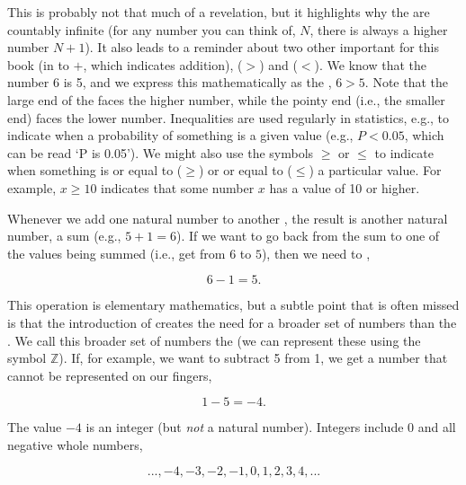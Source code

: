\documentclass[
  openany]{krantz}
\begin{document}
This is probably not that much of a revelation, but it highlights why the  are countably infinite (for any number you can think of, \(N\), there is always a higher number \(N + 1\)).
It also leads to a reminder about two other important  for this book (in  to \(+\), which indicates addition),  (\(>\)) and  (\(<\)).
We know that the number 6 is  5, and we express this mathematically as the \textbf{}, \(6 > 5\).
Note that the large end of the  faces the higher number, while the pointy end (i.e., the smaller end) faces the lower number.
Inequalities are used regularly in statistics, e.g., to indicate when a probability of something is  a given value (e.g., \(P < 0.05\), which can be read `P is  0.05').
We might also use the symbols \(\geq\) or \(\leq\) to indicate when something is  or equal to (\(\geq\)) or  or equal to (\(\leq\)) a particular value.
For example, \(x \geq 10\) indicates that some number \(x\) has a value of 10 or higher.

Whenever we add one natural number to another , the result is another natural number, a sum (e.g., \(5 + 1 = 6\)).
If we want to go back from the sum to one of the values being summed (i.e., get from \(6\) to \(5\)), then we need to ,

\[6 - 1 = 5.\]

This operation is elementary mathematics, but a subtle point that is often missed is that the introduction of  creates the need for a broader set of numbers than the .
We call this broader set of numbers the \emph{} (we can represent these using the symbol \(\mathbb{Z}\)).
If, for example, we want to subtract 5 from 1, we get a number that cannot be represented on our fingers,

\[1 - 5 = -4.\]

The value \(-4\) is an integer (but \emph{not} a natural number).
Integers include 0 and all negative whole numbers,

\[..., -4, -3, -2, -1, 0, 1, 2, 3, 4,  ...\]
\end{document}
